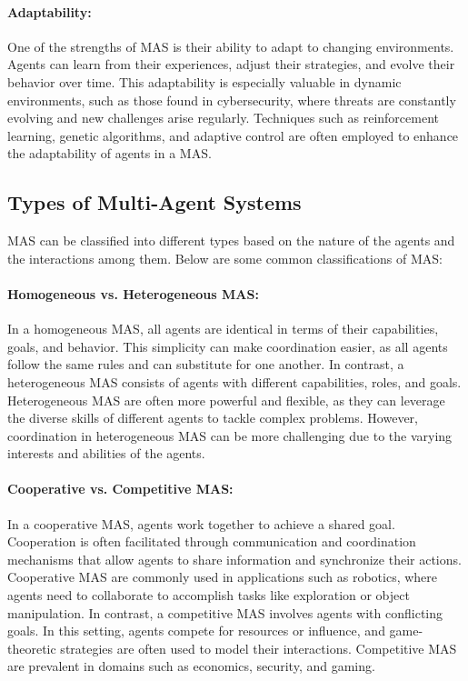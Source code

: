 \paragraph{Adaptability:}
One of the strengths of MAS is their ability to adapt to changing environments. Agents can learn from their experiences, adjust their strategies, and evolve their behavior over time. This adaptability is especially valuable in dynamic environments, such as those found in cybersecurity, where threats are constantly evolving and new challenges arise regularly. Techniques such as reinforcement learning, genetic algorithms, and adaptive control are often employed to enhance the adaptability of agents in a MAS.

\subsection{Types of Multi-Agent Systems}

MAS can be classified into different types based on the nature of the agents and the interactions among them. Below are some common classifications of MAS:

\paragraph{Homogeneous vs. Heterogeneous MAS:}
In a homogeneous MAS, all agents are identical in terms of their capabilities, goals, and behavior. This simplicity can make coordination easier, as all agents follow the same rules and can substitute for one another. In contrast, a heterogeneous MAS consists of agents with different capabilities, roles, and goals. Heterogeneous MAS are often more powerful and flexible, as they can leverage the diverse skills of different agents to tackle complex problems. However, coordination in heterogeneous MAS can be more challenging due to the varying interests and abilities of the agents.

\paragraph{Cooperative vs. Competitive MAS:}
In a cooperative MAS, agents work together to achieve a shared goal. Cooperation is often facilitated through communication and coordination mechanisms that allow agents to share information and synchronize their actions. Cooperative MAS are commonly used in applications such as robotics, where agents need to collaborate to accomplish tasks like exploration or object manipulation. In contrast, a competitive MAS involves agents with conflicting goals. In this setting, agents compete for resources or influence, and game-theoretic strategies are often used to model their interactions. Competitive MAS are prevalent in domains such as economics, security, and gaming.

